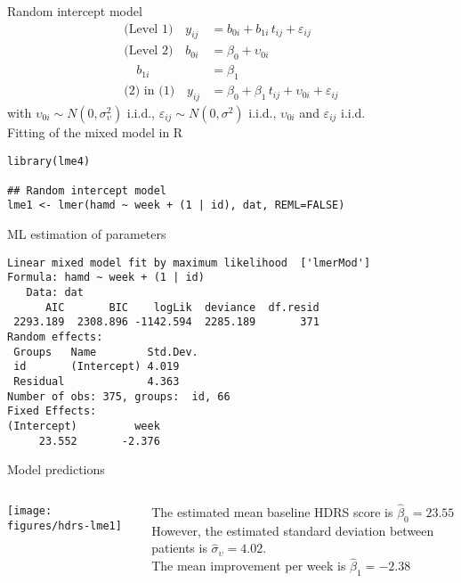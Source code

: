 \documentclass{beamer}
\begin{document}
\begin{frame}[fragile]{Random intercept model}
\begin{align*}
\text{(Level 1)}  \quad y_{ij} &= b_{0i} + b_{1i}\,t_{ij} + \varepsilon_{ij}\\
\text{(Level 2)}  \quad b_{0i} &= \beta_0 + \upsilon_{0i}\\
                  \quad b_{1i} &= \beta_1\\
\text{(2) in (1)} \quad y_{ij} &= \beta_0 + \beta_1\,t_{ij} +
                                  \upsilon_{0i} + \varepsilon_{ij}
\end{align*}
with $\upsilon_{0i} \sim N(0, \sigma^2_{\upsilon})$ i.i.d.,
$\varepsilon_{ij} \sim N(0, \sigma^2)$ i.i.d., $\upsilon_{0i}$ and
$\varepsilon_{ij}$ i.i.d.\\[2ex]

Fitting of the mixed model in R
\begin{lstlisting}
library(lme4)

## Random intercept model
lme1 <- lmer(hamd ~ week + (1 | id), dat, REML=FALSE)
\end{lstlisting}
\end{frame}


\begin{frame}[fragile]{ML estimation of parameters}
\begin{lstlisting}
Linear mixed model fit by maximum likelihood  ['lmerMod']
Formula: hamd ~ week + (1 | id)
   Data: dat
      AIC       BIC    logLik  deviance  df.resid 
 2293.189  2308.896 -1142.594  2285.189       371 
Random effects:
 Groups   Name        Std.Dev.
 id       (Intercept) 4.019   
 Residual             4.363   
Number of obs: 375, groups:  id, 66
Fixed Effects:
(Intercept)         week  
     23.552       -2.376  
\end{lstlisting}
\end{frame}


\begin{frame}{Model predictions}
\begin{columns}
\begin{column}{6cm}
\texttt{[image: figures/hdrs-lme1]}
\end{column}
%
\begin{column}{5cm}
  The estimated mean baseline HDRS score is $\hat{\beta}_0 = 23.55$\\[2ex]

  However, the estimated standard deviation between patients is
  $\hat{\sigma}_\upsilon = 4.02$.\\[2ex]

  The mean improvement per week is $\hat{\beta}_1 = -2.38$
\end{column}
\end{columns}
\end{frame}
\end{document}
